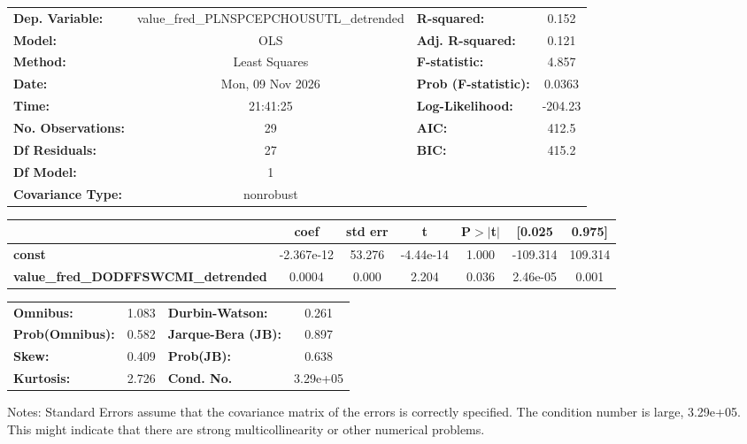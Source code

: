 \begin{center}
\begin{tabular}{lclc}
\toprule
\textbf{Dep. Variable:}                     & value\_fred\_PLNSPCEPCHOUSUTL\_detrended & \textbf{  R-squared:         } &     0.152   \\
\textbf{Model:}                             &                   OLS                    & \textbf{  Adj. R-squared:    } &     0.121   \\
\textbf{Method:}                            &              Least Squares               & \textbf{  F-statistic:       } &     4.857   \\
\textbf{Date:}                              &             Mon, 09 Nov 2026             & \textbf{  Prob (F-statistic):} &   0.0363    \\
\textbf{Time:}                              &                 21:41:25                 & \textbf{  Log-Likelihood:    } &   -204.23   \\
\textbf{No. Observations:}                  &                      29                  & \textbf{  AIC:               } &     412.5   \\
\textbf{Df Residuals:}                      &                      27                  & \textbf{  BIC:               } &     415.2   \\
\textbf{Df Model:}                          &                       1                  & \textbf{                     } &             \\
\textbf{Covariance Type:}                   &                nonrobust                 & \textbf{                     } &             \\
\bottomrule
\end{tabular}
\begin{tabular}{lcccccc}
                                            & \textbf{coef} & \textbf{std err} & \textbf{t} & \textbf{P$> |$t$|$} & \textbf{[0.025} & \textbf{0.975]}  \\
\midrule
\textbf{const}                              &   -2.367e-12  &       53.276     & -4.44e-14  &         1.000        &     -109.314    &      109.314     \\
\textbf{value\_fred\_DODFFSWCMI\_detrended} &       0.0004  &        0.000     &     2.204  &         0.036        &     2.46e-05    &        0.001     \\
\bottomrule
\end{tabular}
\begin{tabular}{lclc}
\textbf{Omnibus:}       &  1.083 & \textbf{  Durbin-Watson:     } &    0.261  \\
\textbf{Prob(Omnibus):} &  0.582 & \textbf{  Jarque-Bera (JB):  } &    0.897  \\
\textbf{Skew:}          &  0.409 & \textbf{  Prob(JB):          } &    0.638  \\
\textbf{Kurtosis:}      &  2.726 & \textbf{  Cond. No.          } & 3.29e+05  \\
\bottomrule
\end{tabular}
\end{center}

Notes: \newline
 [1] Standard Errors assume that the covariance matrix of the errors is correctly specified. \newline
 [2] The condition number is large, 3.29e+05. This might indicate that there are \newline
 strong multicollinearity or other numerical problems.